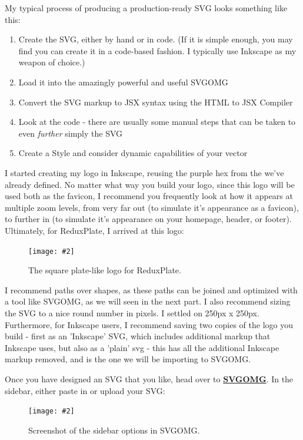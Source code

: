 \documentclass[paper=6in:9in,pagesize=pdftex,headinclude=on,footinclude=on,12pt]{scrbook}
\newcommand{\link}[2]{\textbf{\textcolor{monokaiPink}{\href{#2}{#1}}}}
\newcommand{\standardfigure}[3]{\begin{figure}[H]\begin{center}\texttt{[image: \#2]}\caption{#3}\label{fig:#2}\end{center}\end{figure}}
\begin{document}
My typical process of producing a production-ready SVG looks something like this:

\begin{enumerate}
\item Create the SVG, either by hand or in code. (If it is simple enough, you may find you can create it in a code-based fashion. I typically use Inkscape as my weapon of choice.)
\item Load it into the amazingly powerful and useful SVGOMG
\item Convert the SVG markup to JSX syntax using the HTML to JSX Compiler
\item Look at the code - there are usually some manual steps that can be taken to even \textit{further} simply the SVG
\item Create a Style and consider dynamic capabilities of your vector
\end{enumerate}


I started creating my logo in Inkscape, reusing the purple hex from the  we've already defined. No matter what way you build your logo, since this logo will be used both as the favicon, I recommend you frequently look at how it appears at multiple zoom levels, from very far out (to simulate it's appearance as a favicon), to further in (to simulate it's appearance on your homepage, header, or footer). Ultimately, for ReduxPlate, I arrived at this logo:

\standardfigure{\textwidth/2}{frontend/logo-design/logo}{The square plate-like logo for ReduxPlate.}

I recommend paths over shapes, as these paths can be joined and optimized with a tool like SVGOMG, as we will seen in the next part. I also recommend sizing the SVG to a nice round number in pixels. I settled on 250px x 250px. Furthermore, for Inkscape users, I recommend saving two copies of the logo you build - first as an 'Inkscape' SVG, which includes additional markup that Inkscape uses, but also as a 'plain' svg - this has all the additional Inkscape markup removed, and is the one we will be importing to SVGOMG.


Once you have designed an SVG that you like, head over to \link{SVGOMG}{https://jakearchibald.github.io/svgomg/}. In the sidebar, either paste in or upload your SVG:

\standardfigure{\textwidth}{frontend/logo-design/svgomg-sidebar}{Screenshot of the sidebar options in SVGOMG.}
\end{document}
